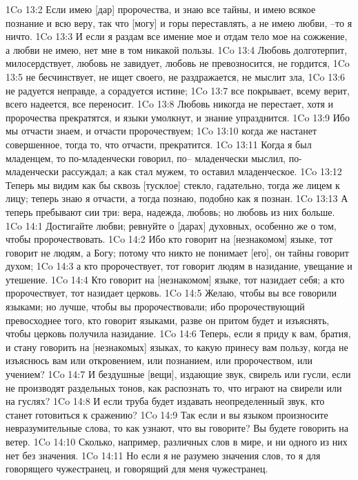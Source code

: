 1Co 13:2  Если имею [дар] пророчества, и знаю все тайны, и имею всякое познание и всю веру, так что [могу] и горы переставлять, а не имею любви, --то я ничто.
1Co 13:3  И если я раздам все имение мое и отдам тело мое на сожжение, а любви не имею, нет мне в том никакой пользы.
1Co 13:4  Любовь долготерпит, милосердствует, любовь не завидует, любовь не превозносится, не гордится,
1Co 13:5  не бесчинствует, не ищет своего, не раздражается, не мыслит зла,
1Co 13:6  не радуется неправде, а сорадуется истине;
1Co 13:7  все покрывает, всему верит, всего надеется, все переносит.
1Co 13:8  Любовь никогда не перестает, хотя и пророчества прекратятся, и языки умолкнут, и знание упразднится.
1Co 13:9  Ибо мы отчасти знаем, и отчасти пророчествуем;
1Co 13:10  когда же настанет совершенное, тогда то, что отчасти, прекратится.
1Co 13:11  Когда я был младенцем, то по-младенчески говорил, по-- младенчески мыслил, по-младенчески рассуждал; а как стал мужем, то оставил младенческое.
1Co 13:12  Теперь мы видим как бы сквозь [тусклое] стекло, гадательно, тогда же лицем к лицу; теперь знаю я отчасти, а тогда познаю, подобно как я познан.
1Co 13:13  А теперь пребывают сии три: вера, надежда, любовь; но любовь из них больше.
1Co 14:1  Достигайте любви; ревнуйте о [дарах] духовных, особенно же о том, чтобы пророчествовать.
1Co 14:2  Ибо кто говорит на [незнакомом] языке, тот говорит не людям, а Богу; потому что никто не понимает [его], он тайны говорит духом;
1Co 14:3  а кто пророчествует, тот говорит людям в назидание, увещание и утешение.
1Co 14:4  Кто говорит на [незнакомом] языке, тот назидает себя; а кто пророчествует, тот назидает церковь.
1Co 14:5  Желаю, чтобы вы все говорили языками; но лучше, чтобы вы пророчествовали; ибо пророчествующий превосходнее того, кто говорит языками, разве он притом будет и изъяснять, чтобы церковь получила назидание.
1Co 14:6  Теперь, если я приду к вам, братия, и стану говорить на [незнакомых] языках, то какую принесу вам пользу, когда не изъяснюсь вам или откровением, или познанием, или пророчеством, или учением?
1Co 14:7  И бездушные [вещи], издающие звук, свирель или гусли, если не производят раздельных тонов, как распознать то, что играют на свирели или на гуслях?
1Co 14:8  И если труба будет издавать неопределенный звук, кто станет готовиться к сражению?
1Co 14:9  Так если и вы языком произносите невразумительные слова, то как узнают, что вы говорите? Вы будете говорить на ветер.
1Co 14:10  Сколько, например, различных слов в мире, и ни одного из них нет без значения.
1Co 14:11  Но если я не разумею значения слов, то я для говорящего чужестранец, и говорящий для меня чужестранец.
